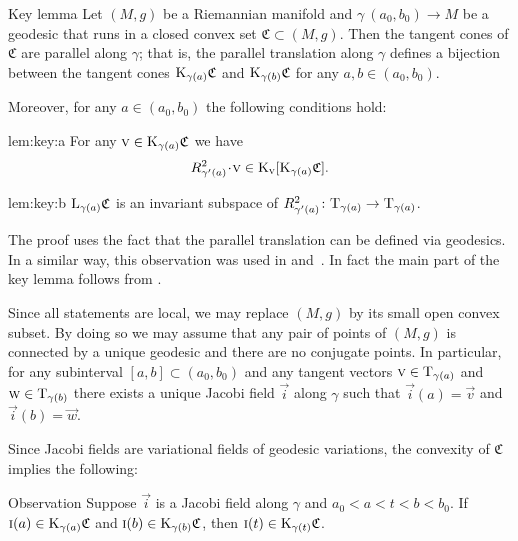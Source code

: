 \documentclass[a4paper,10pt]{article}
\begin{document}
\begin{thm}{Key lemma}\label{lem:key}
Let $(M,g)$ be a Riemannian manifold and $\gamma\:(a_0,b_0)\to M$ be a geodesic that runs in a closed convex set $\mathfrak{C}\subset (M,g)$.
Then the tangent cones of $\mathfrak{C}$ are parallel along $\gamma$; that is, the parallel translation along $\gamma$ defines a bijection between the tangent cones $\mathrm{K}_{\gamma(a)}\mathfrak{C}$ and $\mathrm{K}_{\gamma(b)}\mathfrak{C}$ for any $a,b \in (a_0,b_0)$.

Moreover, for any $a\in (a_0,b_0)$ the following conditions  hold:
\begin{subthm}{lem:key:a}
For any $\text{\sc{v}}\in \mathrm{K}_{\gamma(a)}\mathfrak{C}$ we have
\[R^2_{\gamma'(a)}\cdot \vec{v}\in \K_\vec{v}[\K_{\gamma(a)}\mathfrak{C}].\]
\end{subthm}

\begin{subthm}{lem:key:b} 
$\mathrm{L}_{\gamma(a)}\mathfrak{C}$ is an invariant subspace of $R^2_{\gamma'(a)}\colon\mathrm{T}_{\gamma(a)}\to\mathrm{T}_{\gamma(a)}$.
\end{subthm}

\end{thm}

The proof uses the fact that the parallel translation can be defined via geodesics.
In a similar way, this observation was used in \cite[Section 13]{Ber-Nik} and~\cite{Petruninpar}.
In fact the main part of the key lemma follows from
\cite{Petruninpar}.

Since all statements are local, we may replace $(M,g)$ by its small open convex subset.
By doing so we may assume that any pair of points of $(M,g)$ is connected by a unique geodesic and there are no conjugate points.
In particular, for any subinterval $[a,b]\subset (a_0,b_0)$ and any tangent vectors $\text{\sc{v}} \in \mathrm{T}_{\gamma (a)}$ and $\text{\sc{w}} \in \mathrm{T}_{\gamma (b)}$ there exists a unique Jacobi field $\vec i$ along $\gamma$ 
such that $\vec i(a)=\vec{v}$ and~$\vec i(b)=\vec{w}$.

Since Jacobi fields are variational fields of geodesic variations, 
the convexity of $\mathfrak{C}$ implies the following: 

\begin{thm}{Observation}
Suppose $\vec i$ is a Jacobi field along %
$\gamma$ and $a_0<a<t<b<b_0$.
If 
$\text{\sc{i}}(a)\in \mathrm{K}_{\gamma(a)}\mathfrak{C}$ and $\text{\sc{i}}(b)\in \mathrm{K}_{\gamma(b)}\mathfrak{C}$,
then $\text{\sc{i}}(t)\in \mathrm{K}_{\gamma(t)}\mathfrak{C}$.
\end{thm}
\end{document}
